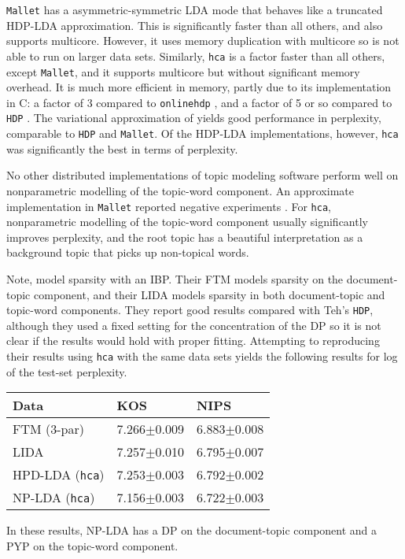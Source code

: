 \documentclass[twoside,11pt]{article}
\begin{document}
{\tt Mallet} \cite{McCallumMALLET} has a asymmetric-symmetric
LDA mode that behaves like a truncated HDP-LDA approximation.
This is significantly faster than all others, and also supports
multicore.  
However, it uses memory duplication with multicore so is not
able to run on larger data sets. 
Similarly, {\tt hca} is a factor faster than all others,
except {\tt Mallet}, and it supports multicore but without
significant memory overhead.
It is much more efficient in memory, partly due
to its implementation in C:  a factor of 3 compared to
{\tt onlinehdp} \cite{WangPB:AISTATS11}, and a factor of 5 or so compared to
{\tt HDP} \cite{TehNBMM21}.
The variational approximation of \cite{Sato:2010} yields
good performance in perplexity, comparable to {\tt HDP} and {\tt Mallet}.
Of the HDP-LDA implementations, however, {\tt hca} was
significantly the best in terms of perplexity.

No other distributed implementations of topic modeling software
perform well on nonparametric modelling of
the topic-word component.
An approximate implementation in {\tt Mallet} reported negative
experiments \cite{wallach2009rethinking}.
For {\tt hca}, nonparametric modelling of
the topic-word component usually significantly improves
perplexity, and the root topic has a beautiful interpretation
as a background topic that picks up non-topical words.

Note, \cite{archambeau2015latent} model sparsity with an
IBP.  Their FTM models sparsity on the
document-topic component,
and their LIDA models sparsity in both document-topic and
topic-word components.
They report good results
compared with Teh's {\tt HDP}, although they used a fixed
setting for the concentration of the DP so it is
not clear if the results would hold with proper fitting.
Attempting to reproducing their results using
{\tt hca} with the same data sets yields
the following results for log of the test-set perplexity.

\begin{tabular}{l|ll}
Data & KOS & NIPS \\\hline
FTM (3-par) & 7.266$\pm$0.009 & 6.883$\pm$0.008 \\
LIDA & 7.257$\pm$0.010 & 6.795$\pm$0.007 \\\hline
HPD-LDA ({\tt hca})& 7.253$\pm$0.003 & 6.792$\pm$0.002  \\
NP-LDA  ({\tt hca})& 7.156$\pm$0.003 & 6.722$\pm$0.003
\end{tabular}

\noindent
In these results, 
NP-LDA has a DP on the document-topic component
and a PYP on the topic-word component.
\end{document}
